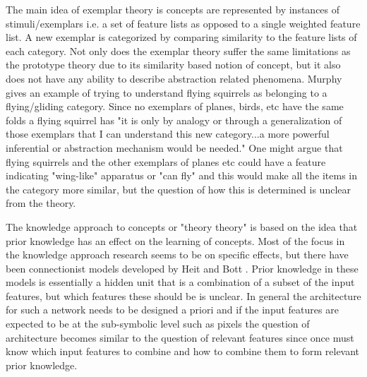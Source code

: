 \documentclass[doc]{apa}%
\begin{document}
The main idea of exemplar theory is concepts are represented by
instances of stimuli/exemplars i.e. a set of feature lists as opposed
to a single weighted feature list.  A new exemplar is categorized by comparing similarity to the feature lists of each category.  Not only does the exemplar theory suffer the same limitations as the prototype theory due to its similarity based notion of concept, but it also does not have any ability to describe abstraction related phenomena.   Murphy \cite{bbc} gives an example of trying to understand flying squirrels as belonging to a flying/gliding category.  Since no exemplars of planes, birds, etc have the same folds a flying squirrel has "it is only by analogy or through a generalization of those exemplars that I can understand this new category...a more powerful inferential or abstraction mechanism would be needed."  One might argue that flying squirrels and the other exemplars of planes etc could have a feature indicating "wing-like" apparatus or "can fly" and this would make all the items in the category more similar, but the question of how this is determined is unclear from the theory.

The knowledge approach to concepts or "theory theory" is based on the
idea that prior knowledge has an effect on the learning of concepts.
Most of the focus in the knowledge approach research seems to be on
specific effects, but there have been connectionist models developed
by Heit and Bott \cite{bbc}.  Prior knowledge in these models is
essentially a hidden unit that is a combination of a subset of the
input features, but which features these should be is unclear.  In
general the architecture for such a network needs to be designed a
priori and if the input features are expected to be at the
sub-symbolic level such as pixels the question of architecture becomes
similar to the question of relevant features since once must know
which input features to combine and how to combine them to form
relevant prior knowledge.   
\end{document}
